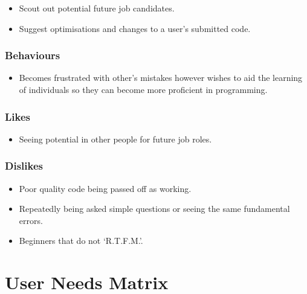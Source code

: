 \documentclass{sig-alt-release2}
\begin{document}
\begin{itemize}
\item Scout out potential future job candidates.
\item Suggest optimisations and changes to a user's submitted code.
\end{itemize}

\subsubsection{Behaviours}

\begin{itemize}
\item Becomes frustrated with other's mistakes however wishes to aid the
learning of individuals so they can become more proficient in programming.
\end{itemize}

\subsubsection{Likes}

\begin{itemize}
\item Seeing potential in other people for future job roles.
\end{itemize}

\subsubsection{Dislikes}

\begin{itemize}
\item Poor quality code being passed off as working.
\item Repeatedly being asked simple questions or seeing the same fundamental
errors.
\item Beginners that do not `R.T.F.M.'.
\end{itemize}

\section{User Needs Matrix}
\end{document}
